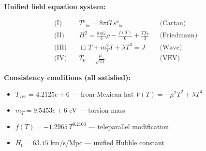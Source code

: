 
\textbf{Unified field equation system:}

\begin{align}
  \text{(I)} \quad & T^a{}_{bc} = 8\pi G \, s^a{}_{bc} && \text{(Cartan)} \\
  \text{(II)} \quad & H^2 = \frac{8\pi G}{3}\rho - \frac{f(T)}{6} + \frac{Tf_T}{3} && \text{(Friedmann)} \\
  \text{(III)} \quad & \Box T + m_T^2 T + \lambda T^3 = J && \text{(Wave)} \\
  \text{(IV)} \quad & T_0 = \frac{\mu}{\sqrt{2\lambda}} && \text{(VEV)}
\end{align}

\textbf{Consistency conditions (all satisfied):}
\begin{itemize}
  \item $T_{\text{vev}} = 4.2125e+6$ — from Mexican hat $V(T) = -\mu^2 T^2 + \lambda T^4$
  \item $m_T = 9.5453e+6$ eV — torsion mass
  \item $f(T) = -1.2965 \, T^{0.2103}$ — teleparallel modification
  \item $H_0 = 63.15$ km/s/Mpc — unified Hubble constant
\end{itemize}